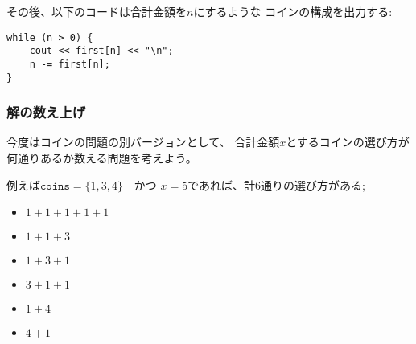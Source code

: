 \begin{comment}
After this, the following code can be used to
print the coins that appear in an optimal solution for
the sum $n$:
\end{comment}

その後、以下のコードは合計金額を$n$にするような
コインの構成を出力する:
\begin{lstlisting}
while (n > 0) {
    cout << first[n] << "\n";
    n -= first[n];
}
\end{lstlisting}

\begin{comment}
\subsubsection{Counting the number of solutions}

Let us now consider another version
of the coin problem where our task is to
calculate the total number of ways
to produce a sum $x$ using the coins.
For example, if $\texttt{coins}=\{1,3,4\}$ and
$x=5$, there are a total of 6 ways:
\end{comment}

\subsubsection{解の数え上げ}

今度はコインの問題の別バージョンとして、
合計金額$x$とするコインの選び方が
何通りあるか数える問題を考えよう。

例えば$\texttt{coins}=\{1,3,4\}$　かつ
$x=5$であれば、計6通りの選び方がある;

\begin{multicols}{2}
\begin{itemize}
\item $1+1+1+1+1$
\item $1+1+3$
\item $1+3+1$
\item $3+1+1$
\item $1+4$
\item $4+1$
\end{itemize}
\end{multicols}

\begin{comment}
Again, we can solve the problem recursively.
Let $\texttt{solve}(x)$ denote the number of ways
we can form the sum $x$.
For example, if $\texttt{coins}=\{1,3,4\}$,
then $\texttt{solve}(5)=6$ and the recursive formula is
\end{comment}


